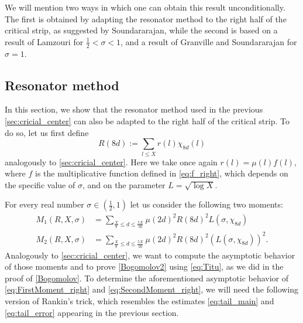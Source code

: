 \documentclass[10pt,a4paper]{amsart}
\theoremstyle{plain}
\theoremstyle{definition}
\theoremstyle{remark}
\begin{document}
We will mention two ways in which one can obtain this result unconditionally. The first is obtained by adapting the resonator method to the right half of the critical strip, as suggested by Soundararajan, while the second is based on a result of Lamzouri \cite{Lamzouri_2011} for $\frac{1}{2} < \sigma < 1$, and a result of Granville and Soundararajan \cite{Granville_Soundararajan_2003} for $\sigma = 1$.

\subsection{Resonator method} In this section, we show that the resonator method used in the previous \cref{sec:cricial_center} can also be adapted to the right half of the critical strip. To do so, let us first define 
    \begin{equation}\label{resonator2}
     R(8d) := \sum_{l \leq X} r(l) \chi_{8d}(l)   
    \end{equation}
     analogously to \cref{sec:cricial_center}. Here we take once again $r(l) = \mu(l) f(l)$, where $f$ is the multiplicative function defined in \eqref{eq:f_right}, which depends on the specific value of $\sigma$, and on the parameter $L = \sqrt{\log X}$. 

For every real number $\sigma \in (\frac{1}{2},1)$ let us consider the following two moments:
\begin{align}
    M_1(R,X,\sigma) &= \sum_{\frac{X}{8}\leq d\leq \frac{5X}{16}}\mu(2d)^2R(8d)^2 L(\sigma,\chi_{8d}) \label{eq:FirstMoment_right} \\
    M_2(R,X,\sigma) &= \sum_{\frac{X}{8}\leq d\leq \frac{5X}{16}} \mu(2d)^2 R(8d)^2 (L(\sigma,\chi_{8d}))^2. \label{eq:SecondMoment_right} 
\end{align}
Analogously to \cref{sec:cricial_center}, we want to compute the asymptotic behavior of those moments and to prove \cref{Bogomolov2} using \eqref{eq:Titu}, as we did in the proof of \cref{Bogomolov}. 
To determine the aforementioned asymptotic behavior of \eqref{eq:FirstMoment_right} and \eqref{eq:SecondMoment_right}, we will need the following version of Rankin's trick, which resembles the estimates \eqref{eq:tail_main} and \eqref{eq:tail_error} appearing in the previous section.
\end{document}
